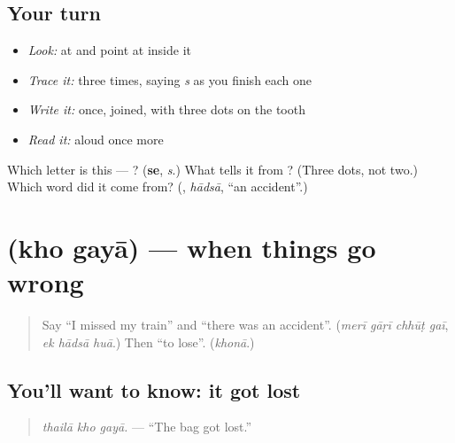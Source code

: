 \subsection*{Your turn}
\begin{itemize}
\raggedright
  \item \emph{Look:} at \textbf{} and point at  inside it
  \item \emph{Trace it:}  three times, saying \emph{s} as you finish each one
  \item \emph{Write it:} \textbf{} once, joined, with three dots on the tooth
  \item \emph{Read it:} \textbf{} aloud once more
\end{itemize}

\begin{tcolorbox}[breakable,colback=teal!4,colframe=teal!35!black,title={Before you move on}]
Which letter is this — ? (\textbf{se}, \emph{s}.) What tells it from ? (Three dots, not two.) Which word did it come from? (\textbf{}, \emph{hādsā}, \textquotedblleft{}an accident\textquotedblright{}.)
\end{tcolorbox}
\section[\texorpdfstring{\ur{کھو} \ur{گیا} (kho gayā)}{کھو گیا (kho gayā)}]{  (kho gayā) — when things go wrong}

\label{lesson:UR-C271-kho-gaya}



\begin{quote}
Say \textquotedblleft{}I missed my train\textquotedblright{} and \textquotedblleft{}there was an accident\textquotedblright{}. (\emph{merī gāṛī chhūṭ gaī}, \emph{ek hādsā huā}.) Then \textquotedblleft{}to lose\textquotedblright{}. (\emph{khonā}.)
\end{quote}

\subsection*{You'll want to know: it got lost}
\begin{quote}
\textbf{  }
\end{quote}

\begin{quote}
\emph{thailā kho gayā.} — \textquotedblleft{}The bag got lost.\textquotedblright{}
\end{quote}

